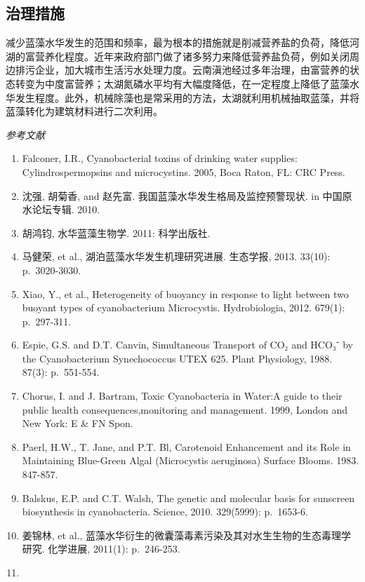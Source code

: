 \documentclass[]{book}
\begin{document}
\subsection{治理措施}

减少蓝藻水华发生的范围和频率，最为根本的措施就是削减营养盐的负荷，降低河湖的富营养化程度。近年来政府部门做了诸多努力来降低营养盐负荷，例如关闭周边排污企业，加大城市生活污水处理力度。云南滇池经过多年治理，由富营养的状态转变为中度富营养；太湖氮磷水平均有大幅度降低，在一定程度上降低了蓝藻水华发生程度。此外，机械除藻也是常采用的方法，太湖就利用机械抽取蓝藻，并将蓝藻转化为建筑材料进行二次利用。

\emph{参考文献}

\begin{enumerate}
\def\labelenumi{\arabic{enumi}.}
\item
  Falconer, I.R., Cyanobacterial toxins of drinking water supplies:
  Cylindrospermopsins and microcystins. 2005, Boca Raton, FL: CRC Press.
\item
  沈强, 胡菊香, and 赵先富. 我国蓝藻水华发生格局及监控预警现状. in
  中国原水论坛专辑. 2010.
\item
  胡鸿钧, 水华蓝藻生物学. 2011: 科学出版社.
\item
  马健荣, et al., 湖泊蓝藻水华发生机理研究进展. 生态学报, 2013. 33(10):
  p.~3020-3030.
\item
  Xiao, Y., et al., Heterogeneity of buoyancy in response to light
  between two buoyant types of cyanobacterium Microcystis.
  Hydrobiologia, 2012. 679(1): p.~297-311.
\item
  Espie, G.S. and D.T. Canvin, Simultaneous Transport of CO₂ and HCO₃⁻
  by the Cyanobacterium Synechococcus UTEX 625. Plant Physiology, 1988.
  87(3): p.~551-554.
\item
  Chorus, I. and J. Bartram, Toxic Cyanobacteria in Water:A guide to
  their public health consequences,monitoring and management. 1999,
  London and New York: E \& FN Spon.
\item
  Paerl, H.W., T. Jane, and P.T. Bl, Carotenoid Enhancement and its Role
  in Maintaining Blue-Green Algal (Microcystis aeruginosa) Surface
  Blooms. 1983. 847-857.
\item
  Balskus, E.P. and C.T. Walsh, The genetic and molecular basis for
  sunscreen biosynthesis in cyanobacteria. Science, 2010. 329(5999):
  p.~1653-6.
\item
  姜锦林, et al.,
  蓝藻水华衍生的微囊藻毒素污染及其对水生生物的生态毒理学研究. 化学进展,
  2011(1): p.~246-253.
\item

\end{enumerate}
\end{document}
